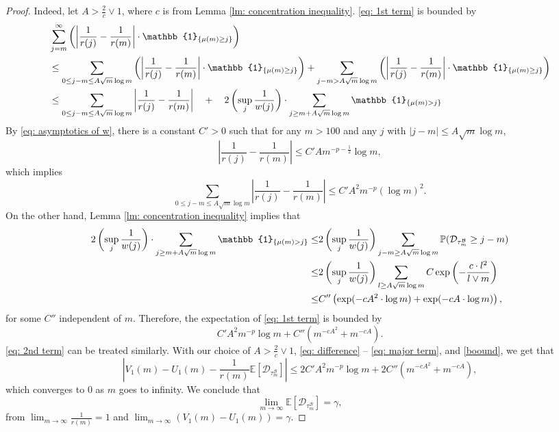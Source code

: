 \documentclass[twoside,12pt, a4paper]{article}
\numberwithin{equation}{section}
\theoremstyle{remark}
\newcommand{\abs}[1]{\left\vert #1 \right\vert}
\begin{document}
\begin{proof}
		Indeed, let $A> \frac{2}{c} \vee 1$, where $c$ is from Lemma \ref{lm: concentration inequality}. \eqref{eq: 1st term} is bounded by
		\begin{align}
			& \sum_{j=m}^{\infty} \left(\abs{\frac{1}{r(j)} -\frac{1}{r(m)} } \cdot \mathbb{1}_{\left\{\mu(m)\geq j \right\}}\right)\\
			& \leq  \sum_{0\leq j-m \leq A \sqrt{m}\log m } \left(\abs{\frac{1}{r(j)} -\frac{1}{r(m)} } \cdot \mathbb{1}_{\left\{\mu(m)\geq j \right\}}\right)
			+  \sum_{j-m > A\sqrt{m}\log m } \left(\abs{\frac{1}{r(j)} -\frac{1}{r(m)} } \cdot \mathbb{1}_{\left\{\mu(m)\geq j \right\}}\right)
			\notag
			\\
			&\leq  \sum_{0\leq j-m \leq A\sqrt{m}\log m } \abs{\frac{1}{r(j)} -\frac{1}{r(m)} }
			\quad +\quad 2\left(\sup_j \frac{1}{w(j)}\right) \cdot \sum_{j\geq m + A\sqrt{m}\log m } \mathbb{1}_{\left\{ \mu(m) > j \right\}}
			\label{low large difference}
		\end{align}
		By \eqref{eq: asymptotics of w}, there is a constant $C'>0$ such that for any $m>100 $ and any $j$ with $\abs{j-m}\leq A \sqrt m \log m $, 
		$$ \abs{\frac{1}{r(j)} -\frac{1}{r(m)} } \leq C' A m^{-p-\frac{1}{2}} \log m, $$
		which implies
		\[
		\sum_{0\leq j-m \leq A\sqrt{m}\log m } \abs{\frac{1}{r(j)} -\frac{1}{r(m)} } \le 
		C' A^2 m^{-p} (\log m)^2.
		\] On the other hand, Lemma \ref{lm: concentration inequality} implies that
		\begin{align*}
			2\left(\sup_j \frac{1}{w(j)}\right) \cdot \sum_{j\geq m + A\sqrt{m}\log m } \mathbb{1}_{\left\{ \mu(m) > j \right\}}
			\le & 2\left(\sup_j \frac{1}{w(j)}\right) \sum_{j-m \geq A \sqrt m \log m  } \mathbb{P}( \mathcal{D}_{\tau^{\mathcal{B}}_m} \geq j-m )  
			\notag 
			\\
			\leq& 2\left(\sup_j \frac{1}{w(j)}\right) \sum_{l \geq A \sqrt m \log m } C \exp\left( - \frac{c  \cdot l^2}{l \vee m}   \right)
			\notag\\
			\leq& C'' \left( \exp (- cA^2 \cdot \log m ) + \exp(-cA \cdot \log m) \right), 
		\end{align*} for some $C''$ independent of $m$. Therefore, the expectation of \eqref{eq: 1st term} is bounded by
		\begin{equation}\label{boound}
			C' A^2 m^{-p} \log m + C''  \left( m ^{-cA^2} +  m^{-cA} \right). 
		\end{equation}
		\eqref{eq: 2nd term} can be treated similarly. With our choice of $A >\frac{2}{c} \vee 1$,
		\eqref{eq: difference} -- 
		\eqref{eq: major term}, and \eqref{boound}, we get that
		$$ \abs{ V_1(m)- U_1(m) -\frac{1}{r(m)}\mathbb{E}\left[ \mathcal{D}_{\tau^{\mathcal{B}}_m} \right] }
		\leq 2C' A^2 m^{-p} \log m + 2C''  \left( m ^{-cA^2} +  m^{-cA} \right), 
		$$ 
		which converges to $0$ as $m$ goes to infinity. We conclude that 
		$$
		\lim_{m\to\infty}\mathbb{E}\left[ \mathcal{D}_{\tau^{\mathcal{B}}_m} \right] = \gamma, 
		$$ 
		from $\lim_{m\to\infty}\frac{1}{r(m)} =1$ and $ \lim_{m\to \infty} \left(V_1(m)-U_1(m) \right) = \gamma$.
	\end{proof}
	
\end{document}
